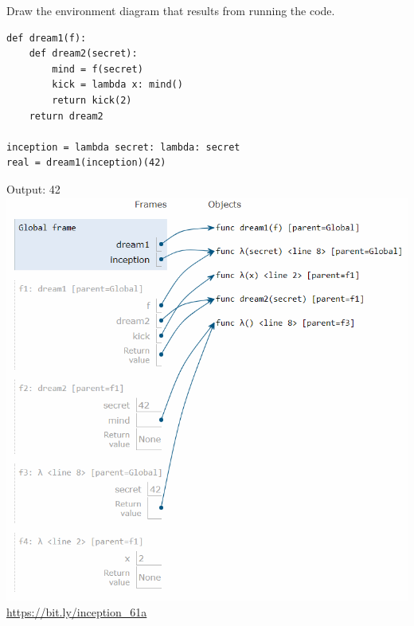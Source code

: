 \begin{blocksection}
\question Draw the environment diagram that results from running the code.

\begin{lstlisting}
def dream1(f):
    def dream2(secret):
        mind = f(secret)
        kick = lambda x: mind()
        return kick(2)
    return dream2

inception = lambda secret: lambda: secret
real = dream1(inception)(42)
\end{lstlisting}

\begin{solution}[2in]
Output: 42 \newline
\includegraphics[scale=0.5]{inception.png}
\newline
\url{https://bit.ly/inception_61a}
\end{solution}
\end{blocksection}
